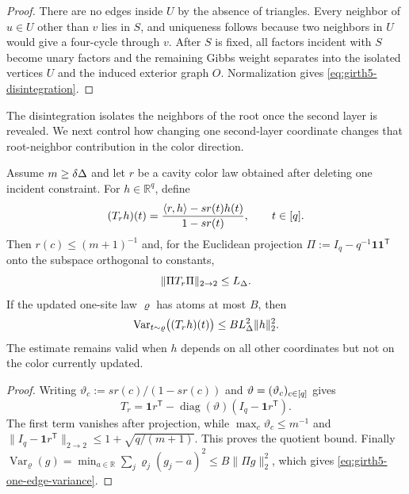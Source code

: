 \begin{proof}
There are no edges inside $U$ by the absence of triangles.  Every neighbor
of $u\in U$ other than $v$ lies in $S$, and uniqueness follows because two
neighbors in $U$ would give a four-cycle through $v$.  After $S$ is fixed, all
factors incident with $S$ become unary factors and the remaining Gibbs weight
separates into the isolated vertices $U$ and the induced exterior graph $O$.
Normalization gives \eqref{eq:girth5-disintegration}.
\end{proof}

The disintegration isolates the neighbors of the root once the second layer is
revealed.  We next control how changing one second-layer coordinate changes
that root-neighbor contribution in the color direction.

\begin{lemma}
\label{lem:girth5-one-edge}
Assume $m\ge\delta\Delta$ and let $r$ be a cavity color law obtained after
deleting one incident constraint.  For $h\in\mathbb R^q$, define
\[
 (T_r h)(t)=\frac{\langle r,h\rangle-sr(t)h(t)}{1-sr(t)},
 \qquad t\in[q].
\]
Then $r(c)\le(m+1)^{-1}$ and, for the Euclidean projection
$\Pi:=I_q-q^{-1}\mathbf1\mathbf1^{\mathsf T}$ onto the subspace
orthogonal to constants,
\[
 \|\Pi T_r\Pi\|_{2\to2}\le L_\Delta.
\]
If the updated one-site law $\varrho$ has atoms at most $B$, then
\begin{equation}\label{eq:girth5-one-edge-variance}
 \operatorname{Var}_{t\sim\varrho}\bigl((T_rh)(t)\bigr)
 \le BL_\Delta^2\|h\|_2^2.
\end{equation}
The estimate remains valid when $h$ depends on all other coordinates but not
on the color currently updated.
\end{lemma}

\begin{proof}
Writing $\vartheta_c:=sr(c)/(1-sr(c))$ and
$\vartheta=(\vartheta_c)_{c\in[q]}$ gives
\[
 T_r=\mathbf1r^{\mathsf T}-\operatorname{diag}(\vartheta)
 (I_q-\mathbf1r^{\mathsf T}).
\]
The first term vanishes after projection, while
$\max_c\vartheta_c\le m^{-1}$ and
$\|I_q-\mathbf1r^{\mathsf T}\|_{2\to2}\le1+\sqrt{q/(m+1)}$.  This proves the quotient
bound.  Finally
$\operatorname{Var}_{\varrho}(g)=\min_{a\in\mathbb R}
\sum_j\varrho_j(g_j-a)^2\le B\|\Pi g\|_2^2$, which gives \eqref{eq:girth5-one-edge-variance}.
\end{proof}

